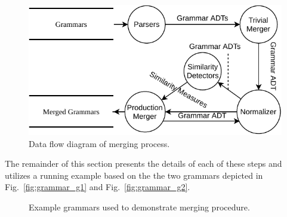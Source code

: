 \documentclass[conference]{IEEEtran}
\begin{document}
\begin{figure}
\hypertarget{fig:approach}{%
\centering
\includegraphics{images/paper/SIGMA-DFD.pdf}
\caption{Data flow diagram of merging process.}\label{fig:approach}
}
\end{figure}

The remainder of this section presents the details of each of these
steps and utilizes a running example based on the the two grammars
depicted in Fig.~\ref{fig:grammar_g1} and Fig.~\ref{fig:grammar_g2}.

\begin{figure}[tb]
 \centering
 \qquad
 \caption{Example grammars used to demonstrate merging procedure.}
\end{figure}
\end{document}
